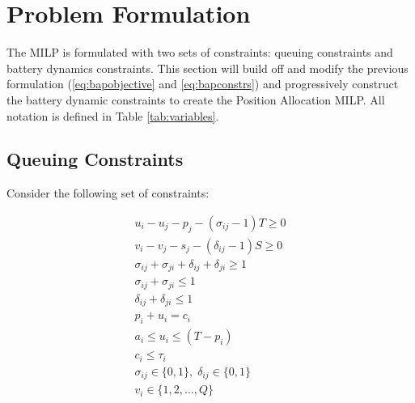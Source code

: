 \documentclass[letterpaper, 10pt, conference]{IEEEtran}
\begin{document}
\section{Problem Formulation}
\label{sec:problemformulation}
The MILP is formulated with two sets of constraints: queuing constraints and battery dynamics constraints. This section will build off and modify the previous formulation (\eqref{eq:bapobjective} and \eqref{eq:bapconstrs}) and progressively construct the battery dynamic constraints to create the Position Allocation MILP. All notation is defined in Table \ref{tab:variables}.

\subsection{Queuing Constraints}
\noindent
Consider the following set of constraints:

\begin{subequations}
\label{eq:packconstrs}
\begin{align}
    u_i - u_j - p_j - (\sigma_{ij} - 1)T \geq 0                      \label{subeq:time}         \\
    v_i - v_j - s_j - (\delta_{ij} - 1)S \geq 0                      \label{subeq:space}        \\
    \sigma_{ij} + \sigma_{ji} + \delta_{ij} + \delta_{ji} \geq 1     \label{subeq:valid_pos}    \\
    \sigma_{ij} + \sigma_{ji} \leq 1                                 \label{subeq:sigma}        \\
    \delta_{ij} + \delta_{ji} \leq 1                                 \label{subeq:delta}        \\
    p_i + u_i = c_i                                                  \label{subeq:detach}       \\
    a_i \leq u_i \leq (T - p_i)                                      \label{subeq:valid_starts} \\
    c_i \leq \tau_i                                                  \label{subeq:valid_depart} \\
    \sigma_{ij} \in \{0,1\},\;\delta_{ij} \in \{0,1\}                \label{subeq:sdspace}      \\
    v_i \in \{1,2, ... , Q\}                                         \label{subeq:vspace}        \\
\end{align}
\end{subequations}
\end{document}
